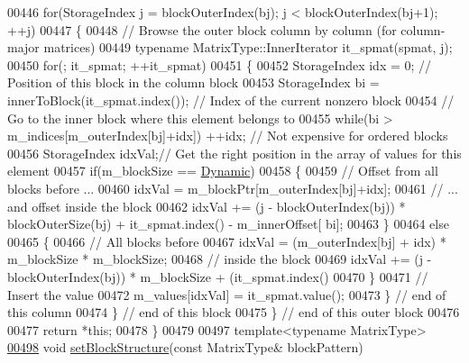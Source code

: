 \begin{DoxyCode}
00446         \textcolor{keywordflow}{for}(StorageIndex j = blockOuterIndex(bj); j < blockOuterIndex(bj+1); ++j)
00447         \{
00448           \textcolor{comment}{// Browse the outer block column by column (for column-major matrices)}
00449           \textcolor{keyword}{typename} MatrixType::InnerIterator it\_spmat(spmat, j);
00450           \textcolor{keywordflow}{for}(; it\_spmat; ++it\_spmat)
00451           \{
00452             StorageIndex idx = 0; \textcolor{comment}{// Position of this block in the column block}
00453             StorageIndex bi = innerToBlock(it\_spmat.index()); \textcolor{comment}{// Index of the current nonzero block}
00454             \textcolor{comment}{// Go to the inner block where this element belongs to}
00455             \textcolor{keywordflow}{while}(bi > m\_indices[m\_outerIndex[bj]+idx]) ++idx; \textcolor{comment}{// Not expensive for ordered blocks}
00456             StorageIndex idxVal;\textcolor{comment}{// Get the right position in the array of values for this element}
00457             \textcolor{keywordflow}{if}(m\_blockSize == \hyperlink{namespace_eigen_ad81fa7195215a0ce30017dfac309f0b2}{Dynamic})
00458             \{
00459               \textcolor{comment}{// Offset from all blocks before ...}
00460               idxVal =  m\_blockPtr[m\_outerIndex[bj]+idx];
00461               \textcolor{comment}{// ... and offset inside the block}
00462               idxVal += (j - blockOuterIndex(bj)) * blockOuterSize(bj) + it\_spmat.index() - m\_innerOffset[
      bi];
00463             \}
00464             \textcolor{keywordflow}{else}
00465             \{
00466               \textcolor{comment}{// All blocks before}
00467               idxVal = (m\_outerIndex[bj] + idx) * m\_blockSize * m\_blockSize;
00468               \textcolor{comment}{// inside the block}
00469               idxVal += (j - blockOuterIndex(bj)) * m\_blockSize + (it\_spmat.index()%
00470             \}
00471             \textcolor{comment}{// Insert the value}
00472             m\_values[idxVal] = it\_spmat.value();
00473           \} \textcolor{comment}{// end of this column}
00474         \} \textcolor{comment}{// end of this block}
00475       \} \textcolor{comment}{// end of this outer block}
00476 
00477       \textcolor{keywordflow}{return} *\textcolor{keyword}{this};
00478     \}
00479 
00497     \textcolor{keyword}{template}<\textcolor{keyword}{typename} MatrixType>
\hyperlink{group___sparse_core___module_a40891e477661e68bc870319d1379c7aa}{00498}     \textcolor{keywordtype}{void} \hyperlink{group___sparse_core___module_a40891e477661e68bc870319d1379c7aa}{setBlockStructure}(\textcolor{keyword}{const} MatrixType& blockPattern)

\end{DoxyCode}
